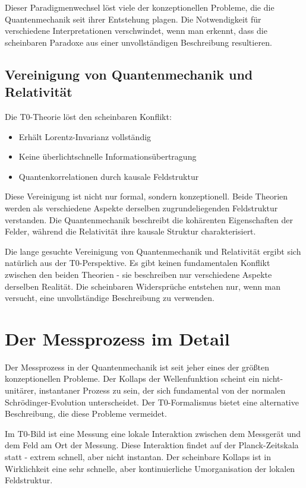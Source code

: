 	Dieser Paradigmenwechsel löst viele der konzeptionellen Probleme, die die Quantenmechanik seit ihrer Entstehung plagen. Die Notwendigkeit für verschiedene Interpretationen verschwindet, wenn man erkennt, dass die scheinbaren Paradoxe aus einer unvollständigen Beschreibung resultieren.
	
	\subsection{Vereinigung von Quantenmechanik und Relativität}
	
	Die T0-Theorie löst den scheinbaren Konflikt:
	\begin{itemize}
		\item Erhält Lorentz-Invarianz vollständig
		\item Keine überlichtschnelle Informationsübertragung
		\item Quantenkorrelationen durch kausale Feldstruktur
	\end{itemize}
	
	Diese Vereinigung ist nicht nur formal, sondern konzeptionell. Beide Theorien werden als verschiedene Aspekte derselben zugrundeliegenden Feldstruktur verstanden. Die Quantenmechanik beschreibt die kohärenten Eigenschaften der Felder, während die Relativität ihre kausale Struktur charakterisiert.
	
	Die lange gesuchte Vereinigung von Quantenmechanik und Relativität ergibt sich natürlich aus der T0-Perspektive. Es gibt keinen fundamentalen Konflikt zwischen den beiden Theorien - sie beschreiben nur verschiedene Aspekte derselben Realität. Die scheinbaren Widersprüche entstehen nur, wenn man versucht, eine unvollständige Beschreibung zu verwenden.
	
	\section{Der Messprozess im Detail}
	
	Der Messprozess in der Quantenmechanik ist seit jeher eines der größten konzeptionellen Probleme. Der Kollaps der Wellenfunktion scheint ein nicht-unitärer, instantaner Prozess zu sein, der sich fundamental von der normalen Schrödinger-Evolution unterscheidet. Der T0-Formalismus bietet eine alternative Beschreibung, die diese Probleme vermeidet.
	
	Im T0-Bild ist eine Messung eine lokale Interaktion zwischen dem Messgerät und dem Feld am Ort der Messung. Diese Interaktion findet auf der Planck-Zeitskala statt - extrem schnell, aber nicht instantan. Der scheinbare Kollaps ist in Wirklichkeit eine sehr schnelle, aber kontinuierliche Umorganisation der lokalen Feldstruktur.
	
